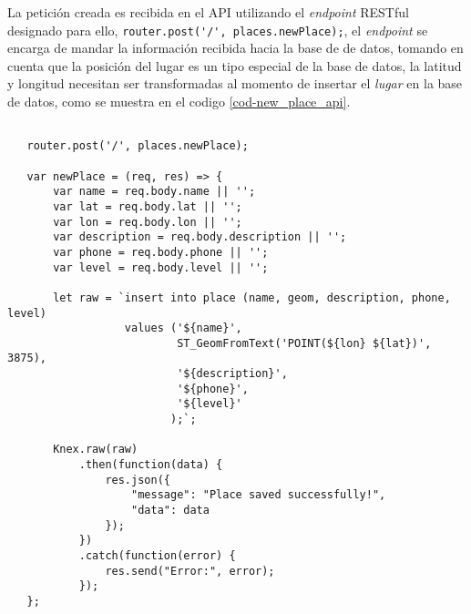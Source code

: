 La petición creada es recibida en el API utilizando el \emph{endpoint} RESTful designado para ello, \verb|router.post('/', places.newPlace);|, el \emph{endpoint} se encarga de mandar la información recibida hacia la base de de datos, tomando en cuenta que la posición del lugar es un tipo especial de la base de datos, la latitud y longitud necesitan ser transformadas al momento de insertar el \emph{lugar} en la base de datos, como se muestra en el codigo \ref{cod-new_place_api}.


\begin{center}
 \begin{lstlisting}[label=cod-new_place_api,caption=Insertar un ``lugar'' en la base de datos.]

   router.post('/', places.newPlace);

   var newPlace = (req, res) => {
       var name = req.body.name || '';
       var lat = req.body.lat || '';
       var lon = req.body.lon || '';
       var description = req.body.description || '';
       var phone = req.body.phone || '';
       var level = req.body.level || '';

       let raw = `insert into place (name, geom, description, phone, level)
                  values ('${name}',
                          ST_GeomFromText('POINT(${lon} ${lat})', 3875),
                          '${description}',
                          '${phone}',
                          '${level}'
                         );`;

       Knex.raw(raw)
           .then(function(data) {
               res.json({
                   "message": "Place saved successfully!",
                   "data": data
               });
           })
           .catch(function(error) {
               res.send("Error:", error);
           });
   };

 \end{lstlisting}
\end{center}






